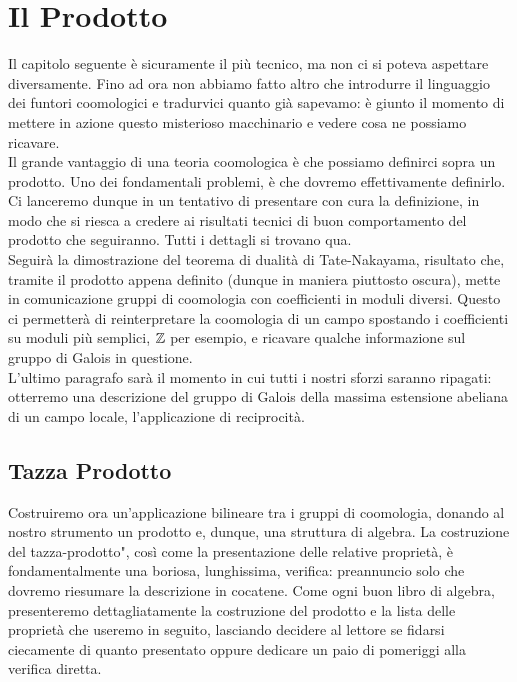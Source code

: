\chapter{Il Prodotto}
Il capitolo seguente è sicuramente il più tecnico, ma non ci si poteva aspettare diversamente. Fino ad ora non abbiamo fatto altro che introdurre il linguaggio dei funtori coomologici e tradurvici quanto già sapevamo: è giunto il momento di mettere in azione questo misterioso macchinario e vedere cosa ne possiamo ricavare.\\

Il grande vantaggio di una teoria coomologica è che possiamo definirci sopra un prodotto. Uno dei fondamentali problemi, è che dovremo effettivamente definirlo. Ci lanceremo dunque in un tentativo di presentare con cura la definizione, in modo che si riesca a credere ai risultati tecnici di buon comportamento del prodotto che seguiranno. Tutti i dettagli si trovano qua. \todo[ref] \\

Seguirà la dimostrazione del teorema di dualità di Tate-Nakayama, risultato che, tramite il prodotto appena definito (dunque in maniera piuttosto oscura), mette in comunicazione gruppi di coomologia con coefficienti in moduli diversi. Questo ci permetterà di reinterpretare la coomologia di un campo spostando i coefficienti su moduli più semplici, $ \mathbb{Z} $ per esempio, e ricavare qualche informazione sul gruppo di Galois in questione. \\

L'ultimo paragrafo sarà il momento in cui tutti i nostri sforzi saranno ripagati: otterremo una descrizione del gruppo di Galois della massima estensione abeliana di un campo locale, l'applicazione di reciprocità.

\section{Tazza Prodotto}
Costruiremo ora un'applicazione bilineare tra i gruppi di coomologia, donando al nostro strumento un prodotto e, dunque, una struttura di algebra. La costruzione del \leftquote tazza-prodotto", così come la presentazione delle relative proprietà, è fondamentalmente una boriosa, lunghissima, verifica: preannuncio solo che dovremo riesumare la descrizione in cocatene. Come ogni buon libro di algebra, presenteremo dettagliatamente la costruzione del prodotto e la lista delle proprietà che useremo in seguito, lasciando decidere al lettore se fidarsi ciecamente di quanto presentato oppure dedicare un paio di pomeriggi alla verifica diretta. \\

